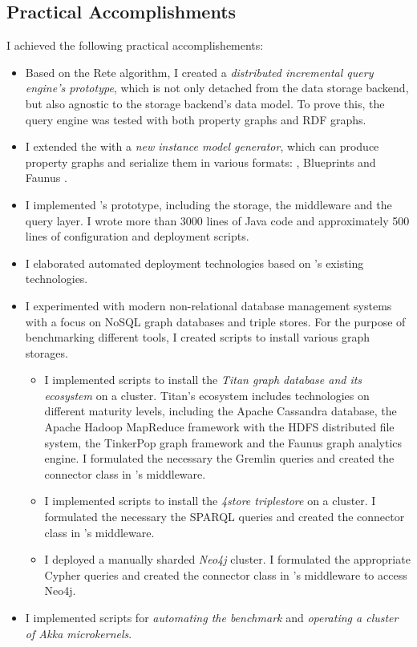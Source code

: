 \subsection{Practical Accomplishments}

I achieved the following practical accomplishements:

\begin{itemize}
  \item Based on the Rete algorithm, I created a \emph{distributed incremental query engine's prototype}, which is not only detached from the data storage backend, but also agnostic to the storage backend's data model. To prove this, the query engine was tested with both property graphs and RDF graphs.
  \item I extended the \tb{} with a \emph{new instance model generator}, which can produce property graphs and serialize them in various formats: \graphml{}, Blueprints \graphson{} and Faunus \graphson{}. %
  \item I implemented \iqd{}'s prototype, including the storage, the middleware and the query layer. I wrote more than 3000 lines of Java code and approximately 500 lines of configuration and deployment scripts.
  \item I elaborated automated deployment technologies based on \eiq{}'s existing technologies.
  \item I experimented with modern non-relational database management systems with a focus on NoSQL graph databases and triple stores. For the purpose of benchmarking different tools, I created scripts to install various graph storages. 
  \begin{itemize}
    \item I implemented scripts to install the \emph{Titan graph database and its ecosystem} on a cluster. Titan's ecosystem includes technologies on different maturity levels, including the Apache Cassandra database, the Apache Hadoop MapReduce framework with the HDFS distributed file system, the TinkerPop graph framework and the Faunus graph analytics engine. I formulated the necessary the Gremlin queries and created the connector class in \iqd{}'s middleware.
    \item I implemented scripts to install the \emph{4store triplestore} on a cluster. I formulated the necessary the SPARQL queries and created the connector class in \iqd{}'s middleware. 
    \item I deployed a manually sharded \emph{Neo4j} cluster. I formulated the appropriate Cypher queries and created the connector class in \iqd{}'s middleware to access Neo4j.
  \end{itemize}
  \item I implemented scripts for \emph{automating the benchmark} and \emph{operating a cluster of Akka microkernels}.
\end{itemize}

